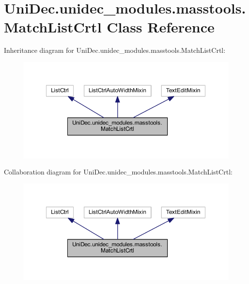 \hypertarget{class_uni_dec_1_1unidec__modules_1_1masstools_1_1_match_list_crtl}{}\section{Uni\+Dec.\+unidec\+\_\+modules.\+masstools.\+Match\+List\+Crtl Class Reference}
\label{class_uni_dec_1_1unidec__modules_1_1masstools_1_1_match_list_crtl}


Inheritance diagram for Uni\+Dec.\+unidec\+\_\+modules.\+masstools.\+Match\+List\+Crtl\+:\nopagebreak
\begin{figure}[H]
\begin{center}
\leavevmode
\includegraphics[width=350pt]{class_uni_dec_1_1unidec__modules_1_1masstools_1_1_match_list_crtl__inherit__graph}
\end{center}
\end{figure}


Collaboration diagram for Uni\+Dec.\+unidec\+\_\+modules.\+masstools.\+Match\+List\+Crtl\+:\nopagebreak
\begin{figure}[H]
\begin{center}
\leavevmode
\includegraphics[width=350pt]{class_uni_dec_1_1unidec__modules_1_1masstools_1_1_match_list_crtl__coll__graph}
\end{center}
\end{figure}
